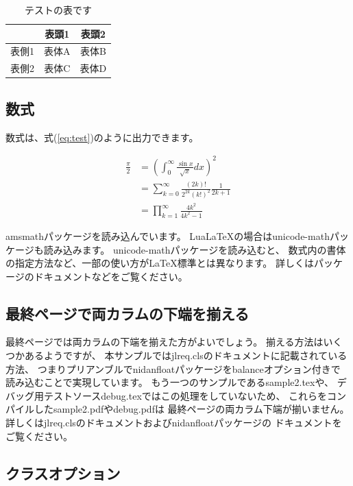 \documentclass{FITpaper}
\begin{document}
\begin{table}
  \centering
  \begin{tabular}{c|cc}
    & 表頭1 & 表頭2 \\
    \hline
    表側1 & 表体A & 表体B \\
    表側2 & 表体C & 表体D \\
  \end{tabular}
  \caption{テストの表です}
  \label{tbl:test}
\end{table}

\subsection{数式}

数式は、式(\ref{eq:test})のように出力できます。

\begin{align}
  \frac{\pi}{2} &=
  \left( \int_{0}^{\infty} \frac{\sin x}{\sqrt{x}} dx \right)^2 \nonumber \\
  &= \sum_{k=0}^{\infty} \frac{(2k)!}{2^{2k}(k!)^2} \frac{1}{2k+1} \nonumber \\
  &= \prod_{k=1}^{\infty} \frac{4k^2}{4k^2 - 1}
  \label{eq:test}
\end{align}

amsmathパッケージを読み込んでいます。
Lua\LaTeX の場合はunicode-mathパッケージも読み込みます。
unicode-mathパッケージを読み込むと、
数式内の書体の指定方法など、一部の使い方が\LaTeX 標準とは異なります。
詳しくはパッケージのドキュメントなどをご覧ください。

\subsection{最終ページで両カラムの下端を揃える}

最終ページでは両カラムの下端を揃えた方がよいでしょう。
揃える方法はいくつかあるようですが、
本サンプルではjlreq.clsのドキュメントに記載されている方法、
つまりプリアンブルでnidanfloatパッケージをbalanceオプション付きで
読み込むことで実現しています。
もう一つのサンプルであるsample2.texや、
デバッグ用テストソースdebug.texではこの処理をしていないため、
これらをコンパイルしたsample2.pdfやdebug.pdfは
最終ページの両カラム下端が揃いません。
詳しくはjlreq.clsのドキュメントおよびnidanfloatパッケージの
ドキュメントをご覧ください。

\subsection{クラスオプション}
\end{document}
